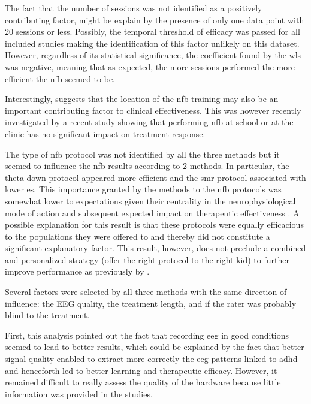 The fact that the number of sessions was not identified as a positively contributing factor, might be explain by the
presence of only one data point with 20 sessions or less. Possibly, the temporal threshold of efficacy was passed for
all included studies making the identification of this factor unlikely on this dataset. However, regardless of its
statistical significance, the coefficient found by the \gls{wls} was negative, meaning that as expected, the more sessions 
performed the more efficient the \gls{nfb} seemed to be. 

Interestingly, \citep{Minder2018} suggests that the location of the \gls{nfb} training may also be an important contributing 
factor to clinical effectiveness. This was however recently investigated by a recent study \citep{Minder2018} showing that 
performing \gls{nfb} at school or at the clinic has no significant impact on treatment response. 

The type of \gls{nfb} protocol was not identified by all the three methods but it seemed to influence the \gls{nfb} results
according to 2 methods. In particular, the theta down protocol appeared more efficient and the \gls{smr} protocol
associated with lower \gls{es}. This importance granted by the methods to the \gls{nfb} protocols was somewhat lower to
expectations given their centrality in the neurophysiological mode of action and subsequent expected impact on
therapeutic effectiveness \citet{Vernon2004}. A possible explanation for this result is that these protocols were equally 
efficacious to the populations they were offered to and thereby did not constitute a significant explanatory factor. 
This result, however, does not preclude a combined and personalized strategy (offer the right protocol to the right kid) 
to further improve performance as previously by \citet{Alkoby2017}.

Several factors were selected by all three methods with the same direction of influence: the EEG quality, the treatment 
length, and if the rater was probably blind to the treatment.

First, this analysis pointed out the fact that recording \gls{eeg} in good conditions seemed to lead to better results,
which could be explained by the fact that better signal quality enabled to extract more correctly the \gls{eeg} patterns
linked to \gls{adhd} and henceforth led to better learning and therapeutic efficacy. However, it remained difficult to
really assess the quality of the hardware because little information was provided in the studies.  

